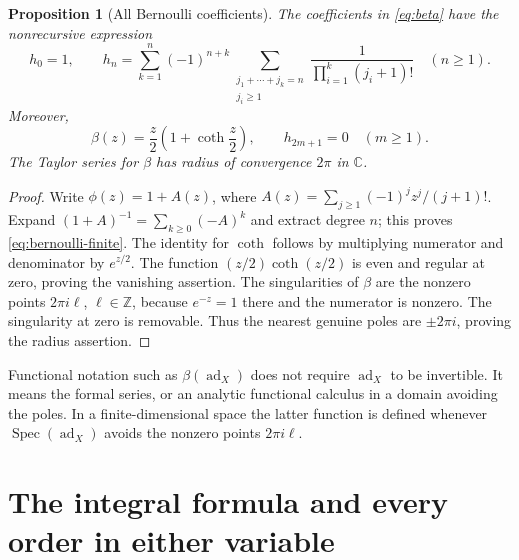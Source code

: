 \documentclass[11pt]{article}
\newtheorem{proposition}[theorem]{Proposition}
\theoremstyle{definition}
\theoremstyle{remark}
\newcommand{\C}{\mathbb C}
\newcommand{\ad}{\operatorname{ad}}
\newcommand{\Spec}{\operatorname{Spec}}
\numberwithin{equation}{section}
\begin{document}
\begin{proposition}[All Bernoulli coefficients]\label{prop:bernoulli}
The coefficients in \eqref{eq:beta} have the nonrecursive expression
\begin{equation}\label{eq:bernoulli-finite}
 h_0=1,\qquad
 h_n=\sum_{k=1}^n(-1)^{n+k}
       \sum_{\substack{j_1+\cdots+j_k=n\\j_i\geq1}}
         \frac1{\prod_{i=1}^k(j_i+1)!}\quad(n\geq1).
\end{equation}
Moreover,
\begin{equation}\label{eq:coth}
 \beta(z)=\frac z2\left(1+\coth\frac z2\right),
 \qquad h_{2m+1}=0\quad(m\geq1).
\end{equation}
The Taylor series for $\beta$ has radius of convergence $2\pi$ in $\C$.
\end{proposition}
\begin{proof}
Write $\phi(z)=1+A(z)$, where $A(z)=\sum_{j\geq1}(-1)^jz^j/(j+1)!$. Expand $(1+A)^{-1}=\sum_{k\geq0}(-A)^k$ and extract degree $n$; this proves \eqref{eq:bernoulli-finite}. The identity for $\coth$ follows by multiplying numerator and denominator by $e^{z/2}$. The function $(z/2)\coth(z/2)$ is even and regular at zero, proving the vanishing assertion. The singularities of $\beta$ are the nonzero points $2\pi i\ell$, $\ell\in\mathbb Z$, because $e^{-z}=1$ there and the numerator is nonzero. The singularity at zero is removable. Thus the nearest genuine poles are $\pm2\pi i$, proving the radius assertion.
\end{proof}
Functional notation such as $\beta(\ad_X)$ does not require $\ad_X$ to be invertible. It means the formal series, or an analytic functional calculus in a domain avoiding the poles. In a finite-dimensional space the latter function is defined whenever $\Spec(\ad_X)$ avoids the nonzero points $2\pi i\ell$.

\section{The integral formula and every order in either variable}\label{sec:integral}
\end{document}
